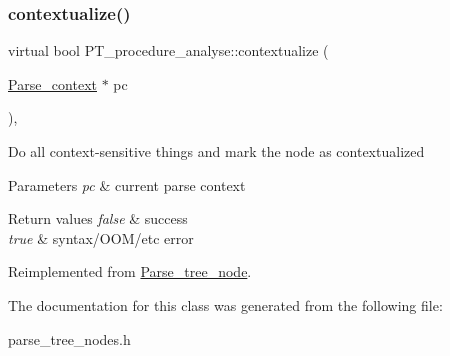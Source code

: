 \subsubsection{\texorpdfstring{contextualize()}{contextualize()}}
{\footnotesize\ttfamily virtual bool P\+T\+\_\+procedure\+\_\+analyse\+::contextualize (\begin{DoxyParamCaption}\item[{\mbox{\hyperlink{structParse__context}{Parse\+\_\+context}} $\ast$}]{pc }\end{DoxyParamCaption})\hspace{0.3cm}{\ttfamily [inline]}, {\ttfamily [virtual]}}

Do all context-\/sensitive things and mark the node as contextualized


\begin{DoxyParams}{Parameters}
{\em pc} & current parse context\\
\hline
\end{DoxyParams}

\begin{DoxyRetVals}{Return values}
{\em false} & success \\
\hline
{\em true} & syntax/\+O\+O\+M/etc error \\
\hline
\end{DoxyRetVals}


Reimplemented from \mbox{\hyperlink{classParse__tree__node_a22d93524a537d0df652d7efa144f23da}{Parse\+\_\+tree\+\_\+node}}.



The documentation for this class was generated from the following file\+:\begin{DoxyCompactItemize}
\item 
parse\+\_\+tree\+\_\+nodes.\+h\end{DoxyCompactItemize}
